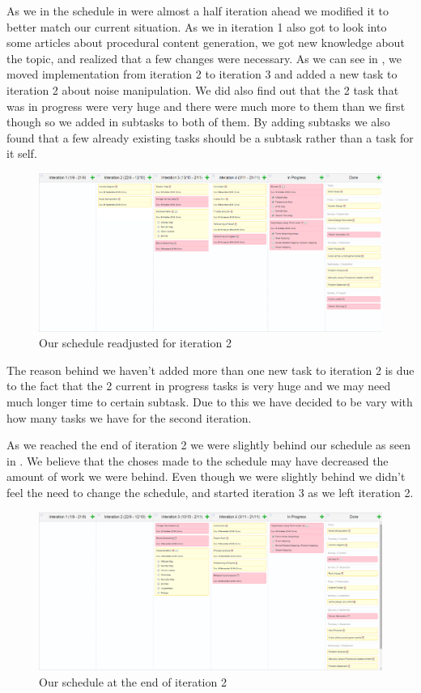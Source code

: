 As we in the schedule in  were almost a half iteration ahead we modified it to better match our current situation. As we in iteration 1 also got to look into some articles about procedural content generation, we got new knowledge about the topic, and realized that a few changes were necessary. As we can see in , we moved implementation from iteration 2 to iteration 3 and added a new task to iteration 2 about noise manipulation. We did also find out that the 2 task that was in progress were very huge and there were much more to them than we first though so we added in subtasks to both of them. By adding subtasks we also found that a few already existing tasks should be a subtask rather than a task for it self.

\begin{figure}[H]
	\includegraphics[width=1.0\linewidth]{img/BeforeIteration2}
	\centering
	\caption{Our schedule readjusted for iteration 2}
	\label{fig:BeforeIteration2}
\end{figure}

The reason behind we haven't added more than one new task to iteration 2 is due to the fact that the 2 current in progress tasks is very huge and we may need much longer time to certain subtask. Due to this we have decided to be vary with how many tasks we have for the second iteration.

As we reached the end of iteration 2 we were slightly behind our schedule as seen in . We believe that the choses made to the schedule may have decreased the amount of work we were behind. Even though we were slightly behind we didn't feel the need to change the schedule, and started iteration 3 as we left iteration 2.

\begin{figure}[H]
	\includegraphics[width=1.0\linewidth]{img/BeforeIteration3}
	\centering
	\caption{Our schedule at the end of iteration 2}
	\label{fig:BeforeIteration3}
\end{figure}

